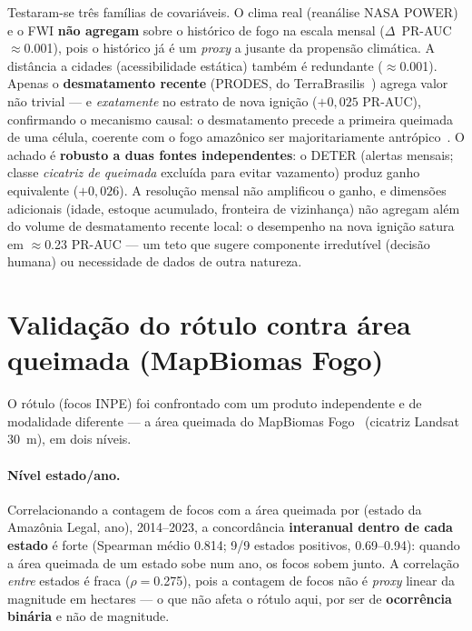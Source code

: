 Testaram-se três famílias de covariáveis. O clima real (reanálise NASA POWER) e o FWI
\textbf{não agregam} sobre o histórico de fogo na escala mensal (\(\Delta\)~PR-AUC
\(\approx\)\num{+0,001}), pois o histórico já é um \emph{proxy} a jusante da propensão
climática. A distância a cidades (acessibilidade estática) também é redundante
(\(\approx\)\num{+0,001}). Apenas o \textbf{desmatamento recente} (PRODES, do
TerraBrasilis~\cite{terrabrasilisprodes}) agrega valor não trivial --- e \emph{exatamente}
no estrato de nova ignição (\(+0{,}025\) PR-AUC), confirmando o mecanismo causal: o
desmatamento precede a primeira queimada de uma célula, coerente com o fogo amazônico ser
majoritariamente antrópico~\cite{aragao2018amazon}. O achado é \textbf{robusto a duas fontes
independentes}: o DETER (alertas mensais; classe \emph{cicatriz de queimada} excluída para
evitar vazamento) produz ganho equivalente (\(+0{,}026\)). A resolução mensal não amplificou
o ganho, e dimensões adicionais (idade, estoque acumulado, fronteira de vizinhança) não
agregam além do volume de desmatamento recente local: o desempenho na nova ignição satura em
\(\approx\)\num{0,23} PR-AUC --- um teto que sugere componente irredutível (decisão humana) ou
necessidade de dados de outra natureza.

\section{Validação do rótulo contra área queimada (MapBiomas Fogo)}
\label{sec:oco_mapbiomas}

O rótulo (focos INPE) foi confrontado com um produto independente e de modalidade diferente
--- a área queimada do MapBiomas Fogo~\cite{mapbiomasfogo} (cicatriz Landsat \SI{30}{m}), em
dois níveis.

\paragraph{Nível estado/ano.} Correlacionando a contagem de focos com a área queimada por
(estado da Amazônia Legal, ano), 2014--2023, a concordância \textbf{interanual dentro de cada
estado} é forte (Spearman médio \num{0,814}; 9/9 estados positivos, \numrange{0,69}{0,94}):
quando a área queimada de um estado sobe num ano, os focos sobem junto. A correlação
\emph{entre} estados é fraca (\(\rho=\)\num{0,275}), pois a contagem de focos não é
\emph{proxy} linear da magnitude em hectares --- o que não afeta o rótulo aqui, por ser de
\textbf{ocorrência binária} e não de magnitude.

